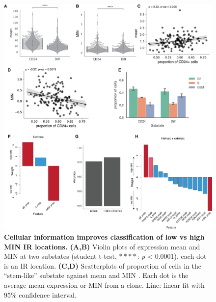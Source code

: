 \begin{figure}[t!]  
    \centering
    \includegraphics[width=\linewidth]{figures/cas/cas_figure5.png}
    \caption[Cellular information improves classification of MIN IR locations.]{%
        \textbf{Cellular information improves classification of low vs high MIN IR locations. (A,B)}
        Violin plots of expression mean  and MIN  at two substates (student t-test, $\ast\ast\ast\ast$: \textit{p} <  0.0001), each dot is an IR location.
        \textbf{(C,D)}
        Scatterplots of proportion of cells in the \enquote{stem-like} substate against mean  and MIN . Each dot is the average mean expression or MIN from a clone. Line: linear fit with 95\% confidence interval. 
        \legendcontdnote
    }
    \label{fig:cas_figure5}
\end{figure}

